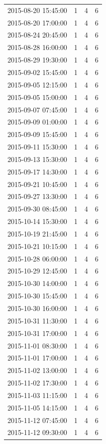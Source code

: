 \begin{tabular}{lrrr}
2015-08-20 15:45:00 & 1 & 4 & 6 \\
2015-08-20 17:00:00 & 1 & 4 & 6 \\
2015-08-24 20:45:00 & 1 & 4 & 6 \\
2015-08-28 16:00:00 & 1 & 4 & 6 \\
2015-08-29 19:30:00 & 1 & 4 & 6 \\
2015-09-02 15:45:00 & 1 & 4 & 6 \\
2015-09-05 12:15:00 & 1 & 4 & 6 \\
2015-09-05 15:00:00 & 1 & 4 & 6 \\
2015-09-07 07:45:00 & 1 & 4 & 6 \\
2015-09-09 01:00:00 & 1 & 4 & 6 \\
2015-09-09 15:45:00 & 1 & 4 & 6 \\
2015-09-11 15:30:00 & 1 & 4 & 6 \\
2015-09-13 15:30:00 & 1 & 4 & 6 \\
2015-09-17 14:30:00 & 1 & 4 & 6 \\
2015-09-21 10:45:00 & 1 & 4 & 6 \\
2015-09-27 13:30:00 & 1 & 4 & 6 \\
2015-09-30 08:45:00 & 1 & 4 & 6 \\
2015-10-14 15:30:00 & 1 & 4 & 6 \\
2015-10-19 21:45:00 & 1 & 4 & 6 \\
2015-10-21 10:15:00 & 1 & 4 & 6 \\
2015-10-28 06:00:00 & 1 & 4 & 6 \\
2015-10-29 12:45:00 & 1 & 4 & 6 \\
2015-10-30 14:00:00 & 1 & 4 & 6 \\
2015-10-30 15:45:00 & 1 & 4 & 6 \\
2015-10-30 16:00:00 & 1 & 4 & 6 \\
2015-10-31 11:30:00 & 1 & 4 & 6 \\
2015-10-31 17:00:00 & 1 & 4 & 6 \\
2015-11-01 08:30:00 & 1 & 4 & 6 \\
2015-11-01 17:00:00 & 1 & 4 & 6 \\
2015-11-02 13:00:00 & 1 & 4 & 6 \\
2015-11-02 17:30:00 & 1 & 4 & 6 \\
2015-11-03 11:15:00 & 1 & 4 & 6 \\
2015-11-05 14:15:00 & 1 & 4 & 6 \\
2015-11-12 07:45:00 & 1 & 4 & 6 \\
2015-11-12 09:30:00 & 1 & 4 & 6 \\

\end{tabular}
